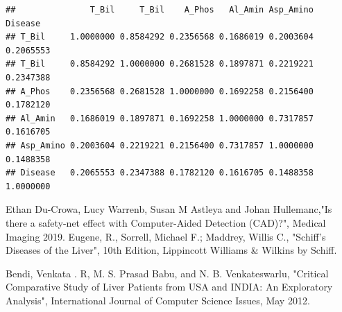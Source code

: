 \documentclass[]{article}
\newenvironment{Shaded}{\begin{snugshade}}{\end{snugshade}}
\newcommand{\DataTypeTok}[1]{\textcolor[rgb]{0.13,0.29,0.53}{#1}}
\newcommand{\DecValTok}[1]{\textcolor[rgb]{0.00,0.00,0.81}{#1}}
\newcommand{\KeywordTok}[1]{\textcolor[rgb]{0.13,0.29,0.53}{\textbf{#1}}}
\newcommand{\NormalTok}[1]{#1}
\newcommand{\OperatorTok}[1]{\textcolor[rgb]{0.81,0.36,0.00}{\textbf{#1}}}
\newcommand{\StringTok}[1]{\textcolor[rgb]{0.31,0.60,0.02}{#1}}
\begin{document}
\begin{Shaded}
\end{Shaded}

\begin{verbatim}
##               T_Bil     T_Bil    A_Phos   Al_Amin Asp_Amino   Disease
## T_Bil     1.0000000 0.8584292 0.2356568 0.1686019 0.2003604 0.2065553
## T_Bil     0.8584292 1.0000000 0.2681528 0.1897871 0.2219221 0.2347388
## A_Phos    0.2356568 0.2681528 1.0000000 0.1692258 0.2156400 0.1782120
## Al_Amin   0.1686019 0.1897871 0.1692258 1.0000000 0.7317857 0.1616705
## Asp_Amino 0.2003604 0.2219221 0.2156400 0.7317857 1.0000000 0.1488358
## Disease   0.2065553 0.2347388 0.1782120 0.1616705 0.1488358 1.0000000
\end{verbatim}

\begin{thebibliography}{9}
Ethan Du-Crowa, Lucy Warrenb, Susan M Astleya and Johan Hullemanc,"Is there a safety-net effect with Computer-Aided Detection (CAD)?", Medical Imaging 2019.
Eugene, R., Sorrell, Michael F.; Maddrey, Willis C., "Schiff's Diseases of the Liver", 10th Edition, Lippincott Williams \& Wilkins by Schiff.

Bendi,  Venkata . R, M. S. Prasad Babu, and N. B. Venkateswarlu, "Critical Comparative Study of Liver Patients from USA and INDIA: An Exploratory Analysis", International Journal of Computer Science Issues, May 2012.


\end{thebibliography}
\end{document}
